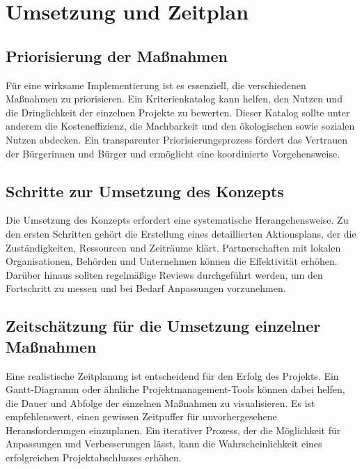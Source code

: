 \section{Umsetzung und Zeitplan}
\subsection{Priorisierung der Maßnahmen}
Für eine wirksame Implementierung ist es essenziell, die verschiedenen Maßnahmen zu priorisieren. Ein Kriterienkatalog kann helfen, den Nutzen und die Dringlichkeit der einzelnen Projekte zu bewerten. Dieser Katalog sollte unter anderem die Kosteneffizienz, die Machbarkeit und den ökologischen sowie sozialen Nutzen abdecken. Ein transparenter Priorisierungsprozess fördert das Vertrauen der Bürgerinnen und Bürger und ermöglicht eine koordinierte Vorgehensweise.
\subsection{Schritte zur Umsetzung des Konzepts}
Die Umsetzung des Konzepts erfordert eine systematische Herangehensweise. Zu den ersten Schritten gehört die Erstellung eines detaillierten Aktionsplans, der die Zuständigkeiten, Ressourcen und Zeiträume klärt. Partnerschaften mit lokalen Organisationen, Behörden und Unternehmen können die Effektivität erhöhen. Darüber hinaus sollten regelmäßige Reviews durchgeführt werden, um den Fortschritt zu messen und bei Bedarf Anpassungen vorzunehmen.
\subsection{Zeitschätzung für die Umsetzung einzelner Maßnahmen}
Eine realistische Zeitplanung ist entscheidend für den Erfolg des Projekts. Ein Gantt-Diagramm oder ähnliche Projektmanagement-Tools können dabei helfen, die Dauer und Abfolge der einzelnen Maßnahmen zu visualisieren. Es ist empfehlenswert, einen gewissen Zeitpuffer für unvorhergesehene Herausforderungen einzuplanen. Ein iterativer Prozess, der die Möglichkeit für Anpassungen und Verbesserungen lässt, kann die Wahrscheinlichkeit eines erfolgreichen Projektabschlusses erhöhen.
